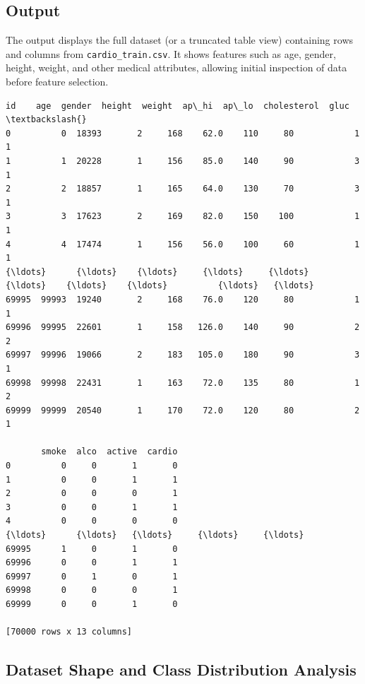 \documentclass[11pt,a4paper]{report}
\makeatletter
\newcommand{\boxspacing}{\kern\kvtcb@left@rule\kern\kvtcb@boxsep}
\newcommand{\prompt}[4]{
        {\ttfamily\llap{{\color{#2}[#3]:\hspace{3pt}#4}}\vspace{-\baselineskip}}
    }
\makeatother
\begin{document}
\subsection*{Output}
The output displays the full dataset (or a truncated table view) containing rows and columns from \texttt{cardio\_train.csv}. It shows features such as age, gender, height, weight, and other medical attributes, allowing initial inspection of data before feature selection.
            \begin{tcolorbox}[breakable, size=fbox, boxrule=.5pt, pad at break*=1mm, opacityfill=0]
\prompt{Out}{outcolor}{63}{\boxspacing}
\begin{Verbatim}[commandchars=\\\{\}]
          id    age  gender  height  weight  ap\_hi  ap\_lo  cholesterol  gluc  \textbackslash{}
0          0  18393       2     168    62.0    110     80            1     1
1          1  20228       1     156    85.0    140     90            3     1
2          2  18857       1     165    64.0    130     70            3     1
3          3  17623       2     169    82.0    150    100            1     1
4          4  17474       1     156    56.0    100     60            1     1
{\ldots}      {\ldots}    {\ldots}     {\ldots}     {\ldots}     {\ldots}    {\ldots}    {\ldots}          {\ldots}   {\ldots}
69995  99993  19240       2     168    76.0    120     80            1     1
69996  99995  22601       1     158   126.0    140     90            2     2
69997  99996  19066       2     183   105.0    180     90            3     1
69998  99998  22431       1     163    72.0    135     80            1     2
69999  99999  20540       1     170    72.0    120     80            2     1

       smoke  alco  active  cardio
0          0     0       1       0
1          0     0       1       1
2          0     0       0       1
3          0     0       1       1
4          0     0       0       0
{\ldots}      {\ldots}   {\ldots}     {\ldots}     {\ldots}
69995      1     0       1       0
69996      0     0       1       1
69997      0     1       0       1
69998      0     0       0       1
69999      0     0       1       0

[70000 rows x 13 columns]
\end{Verbatim}
\end{tcolorbox}


\subsection{Dataset Shape and Class Distribution Analysis}
\end{document}
